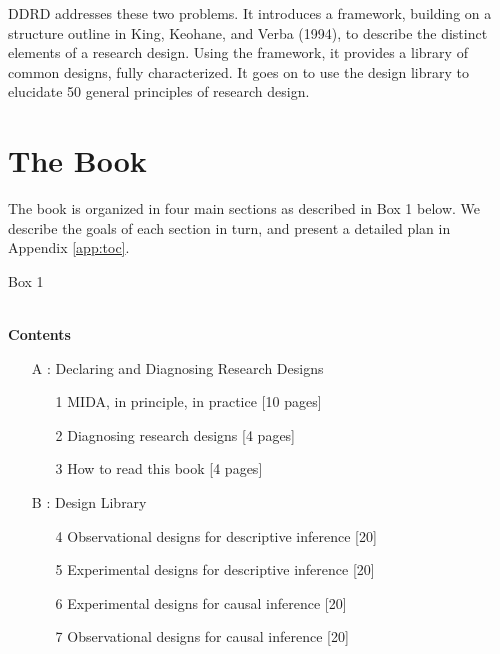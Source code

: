 \documentclass[11pt]{article}
\begin{document}
DDRD addresses these two problems. It introduces a framework, building on a structure outline in King, Keohane, and Verba (1994), to describe the distinct elements of a research design. Using the framework, it provides a library of common designs, fully characterized. It goes on to use the design library to elucidate 50 general principles of research design.
\newpage
\section{The Book}

The book is organized in four main sections as described in Box 1 below. We describe the goals of each section in turn, and present a detailed plan in Appendix \ref{app:toc}.

\begin{framed}
\begin{centering} Box 1 \end{centering}\\

	\noindent\textbf{Contents}
	\begin{enumerate}
		\item[A]: Declaring and Diagnosing Research Designs
		
		\begin{enumerate}
			\item[1] MIDA, in principle, in practice [10 pages]
			\item[2] Diagnosing research designs [4 pages]
			\item[3] How to read this book [4 pages]
		\end{enumerate}
		
		\item[B]: Design Library
		\begin{enumerate}
			\item[4] Observational designs for descriptive inference [20]
			\item[5] Experimental designs for descriptive inference [20]
			\item[6] Experimental designs for causal inference	 [20]
			\item[7] Observational designs for causal inference [20]
		\end{enumerate}
		

\end{enumerate}
\end{framed}
\end{document}
